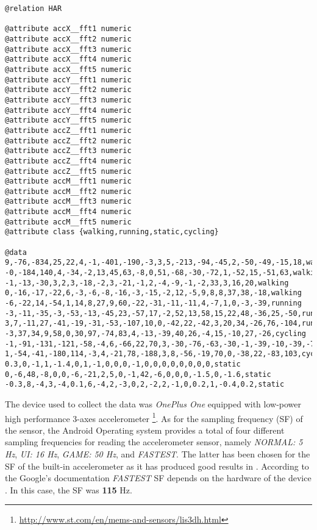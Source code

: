 \begin{lstlisting}[caption=WEKA ARFF file extract,
label=weka-arff-code,captionpos=b, frame=single,basicstyle=\small,float,floatplacement=H,breaklines=true]
@relation HAR
    
@attribute accX__fft1 numeric
@attribute accX__fft2 numeric
@attribute accX__fft3 numeric
@attribute accX__fft4 numeric
@attribute accX__fft5 numeric
@attribute accY__fft1 numeric
@attribute accY__fft2 numeric
@attribute accY__fft3 numeric
@attribute accY__fft4 numeric
@attribute accY__fft5 numeric
@attribute accZ__fft1 numeric
@attribute accZ__fft2 numeric
@attribute accZ__fft3 numeric
@attribute accZ__fft4 numeric
@attribute accZ__fft5 numeric
@attribute accM__fft1 numeric
@attribute accM__fft2 numeric
@attribute accM__fft3 numeric
@attribute accM__fft4 numeric
@attribute accM__fft5 numeric
@attribute class {walking,running,static,cycling}
    
@data
9,-76,-834,25,22,4,-1,-401,-190,-3,3,5,-213,-94,-45,2,-50,-49,-15,18,walking
-0,-184,140,4,-34,-2,13,45,63,-8,0,51,-68,-30,-72,1,-52,15,-51,63,walking
-1,-13,-30,3,2,3,-18,-2,3,-21,-1,2,-4,-9,-1,-2,33,3,16,20,walking
0,-16,-17,-22,6,-3,-6,-8,-16,-3,-15,-2,12,-5,9,8,8,37,38,-18,walking
-6,-22,14,-54,1,14,8,27,9,60,-22,-31,-11,-11,4,-7,1,0,-3,-39,running
-3,-11,-35,-3,-53,-13,-45,23,-57,17,-2,52,13,58,15,22,48,-36,25,-50,running
3,7,-11,27,-41,-19,-31,-53,-107,10,0,-42,22,-42,3,20,34,-26,76,-104,running
-3,37,34,9,58,0,30,97,-74,83,4,-13,-39,40,26,-4,15,-10,27,-26,cycling
-1,-91,-131,-121,-58,-4,6,-66,22,70,3,-30,-76,-63,-30,-1,-39,-10,-39,-76,cycling
1,-54,-41,-180,114,-3,4,-21,78,-188,3,8,-56,-19,70,0,-38,22,-83,103,cycling
0.3,0,-1,1,-1.4,0,1,-1,0,0,0,-1,0,0,0,0,0,0,0,0,static
0,-6,48,-8,0,0,-6,-21,2,5,0,-1,42,-6,0,0,0,-1.5,0,-1.6,static
-0.3,8,-4,3,-4,0.1,6,-4,2,-3,0,2,-2,2,-1,0,0.2,1,-0.4,0.2,static
\end{lstlisting}
    
    The device used to collect the data was \textit{OnePlus One} equipped with low-power high performance 3-axes accelerometer \footnote{\url{http://www.st.com/en/mems-and-sensors/lis3dh.html}}. As for the sampling frequency (SF) of the sensor, the Android Operating system provides a total of four different sampling frequencies for reading the accelerometer sensor, namely \textit{NORMAL: 5 Hz}, \textit{UI: 16 Hz}, \textit{GAME: 50 Hz}, and \textit{FASTEST}. The latter has been chosen for the SF of the built-in accelerometer as it has produced good results in \citet[3-5]{lee2016}. According to the Google's documentation \textit{FASTEST} SF depends on the hardware of the device \citep{googlesensormanager2017}. In this case, the SF was \textbf{115} Hz. 
    
